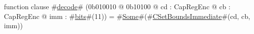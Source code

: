 function clause #\hyperref[zdecode]{decode}# (0b010010 @ 0b10100 @ cd : CapRegEnc @ cb : CapRegEnc @ imm : #\hyperref[zbits]{bits}#(11)) = #\hyperref[zSome]{Some}#(#\hyperref[zCSetBoundsImmediate]{CSetBoundsImmediate}#(cd, cb, imm))
